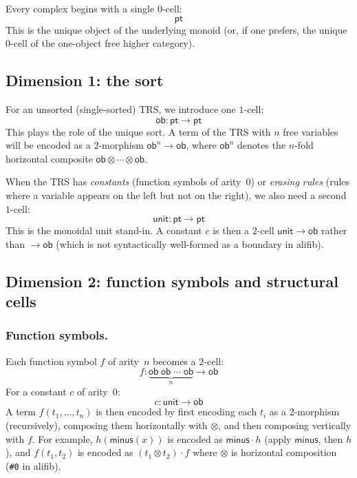 \documentclass[acmsmall,screen,nonacm]{acmart}
\newcommand{\ob}{\mathsf{ob}}
\newcommand{\unit}{\mathsf{unit}}
\newcommand{\alifib}{\textsf{alifib}}
\begin{document}
Every complex begins with a single $0$-cell:
\[
  \mathsf{pt}
\]
This is the unique object of the underlying monoid (or, if one prefers,
the unique $0$-cell of the one-object free higher category).

\subsection{Dimension 1: the sort}
\label{sec:dim1}

For an unsorted (single-sorted) TRS, we introduce one $1$-cell:
\[
  \ob : \mathsf{pt} \to \mathsf{pt}
\]
This plays the role of the unique sort.  A term of the TRS with $n$
free variables will be encoded as a $2$-morphism
$\ob^n \to \ob$, where $\ob^n$ denotes the $n$-fold horizontal
composite $\ob \otimes \cdots \otimes \ob$.

When the TRS has \emph{constants} (function symbols of arity~$0$) or
\emph{erasing rules} (rules where a variable appears on the left but
not on the right), we also need a second $1$-cell:
\[
  \unit : \mathsf{pt} \to \mathsf{pt}
\]
This is the monoidal unit stand-in.  A constant $c$ is then a $2$-cell
$\unit \to \ob$ rather than $\to \ob$ (which is not syntactically
well-formed as a boundary in \alifib).

\subsection{Dimension 2: function symbols and structural cells}
\label{sec:dim2}

\subsubsection{Function symbols.}
Each function symbol $f$ of arity~$n$ becomes a $2$-cell:
\[
  f : \underbrace{\ob\;\ob\;\cdots\;\ob}_{n} \to \ob
\]
For a constant $c$ of arity~$0$:
\[
  c : \unit \to \ob
\]
A term $f(t_1, \ldots, t_n)$ is then encoded by first encoding each
$t_i$ as a $2$-morphism (recursively), composing them horizontally
with $\otimes$, and then composing vertically with $f$.  For example,
$h(\mathsf{minus}(x))$ is encoded as
$\mathsf{minus} \cdot h$
(apply $\mathsf{minus}$, then $h$), and $f(t_1, t_2)$ is encoded as
$(t_1 \otimes t_2) \cdot f$ where $\otimes$ is horizontal composition
(\texttt{\#0} in \alifib).
\end{document}
